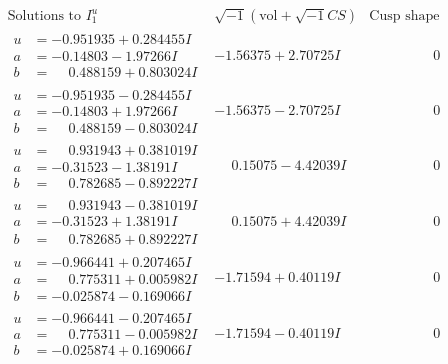 \documentclass[1p]{elsarticle_modified}
\theoremstyle{definition}
\newcommand{\I}{\sqrt{-1}}
\begin{document}
$$\begin{array}{c|c|c}  
\text{Solutions to }I^u_{1}& \I (\text{vol} + \sqrt{-1}CS) & \text{Cusp shape}\\
 \hline 
\begin{aligned}
u &= -0.951935 + 0.284455 I \\
a &= -0.14803 - 1.97266 I \\
b &= \phantom{-}0.488159 + 0.803024 I\end{aligned}
 & -1.56375 + 2.70725 I & \phantom{-0.000000 } 0 \\ \hline\begin{aligned}
u &= -0.951935 - 0.284455 I \\
a &= -0.14803 + 1.97266 I \\
b &= \phantom{-}0.488159 - 0.803024 I\end{aligned}
 & -1.56375 - 2.70725 I & \phantom{-0.000000 } 0 \\ \hline\begin{aligned}
u &= \phantom{-}0.931943 + 0.381019 I \\
a &= -0.31523 - 1.38191 I \\
b &= \phantom{-}0.782685 - 0.892227 I\end{aligned}
 & \phantom{-}0.15075 - 4.42039 I & \phantom{-0.000000 } 0 \\ \hline\begin{aligned}
u &= \phantom{-}0.931943 - 0.381019 I \\
a &= -0.31523 + 1.38191 I \\
b &= \phantom{-}0.782685 + 0.892227 I\end{aligned}
 & \phantom{-}0.15075 + 4.42039 I & \phantom{-0.000000 } 0 \\ \hline\begin{aligned}
u &= -0.966441 + 0.207465 I \\
a &= \phantom{-}0.775311 + 0.005982 I \\
b &= -0.025874 - 0.169066 I\end{aligned}
 & -1.71594 + 0.40119 I & \phantom{-0.000000 } 0 \\ \hline\begin{aligned}
u &= -0.966441 - 0.207465 I \\
a &= \phantom{-}0.775311 - 0.005982 I \\
b &= -0.025874 + 0.169066 I\end{aligned}
 & -1.71594 - 0.40119 I & \phantom{-0.000000 } 0 \\ \hline\begin{aligned}

\end{aligned}
\end{array}$$
\end{document}
